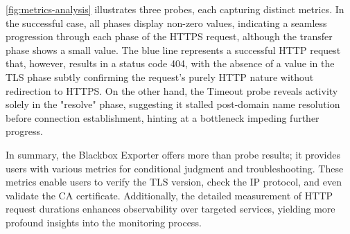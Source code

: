 \autoref{fig:metrics-analysis} illustrates three probes, each capturing distinct metrics. In the successful case, all phases display non-zero values, indicating a seamless progression through each phase of the \ac{HTTPS} request, although the transfer phase shows a small value. The blue line represents a successful \ac{HTTP} request that, however, results in a status code 404, with the absence of a value in the \ac{TLS} phase subtly confirming the request's purely \ac{HTTP} nature without redirection to \ac{HTTPS}. On the other hand, the Timeout probe reveals activity solely in the "resolve" phase, suggesting it stalled post-domain name resolution before connection establishment, hinting at a bottleneck impeding further progress. 

In summary, the Blackbox Exporter offers more than probe results; it provides users with various metrics for conditional judgment and troubleshooting. These metrics enable users to verify the \ac{TLS} version, check the \ac{IP} protocol, and even validate the \ac{CA} certificate. Additionally, the detailed measurement of \ac{HTTP} request durations enhances observability over targeted services, yielding more profound insights into the monitoring process. 





